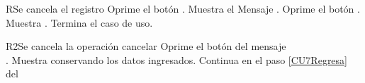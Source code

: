 \begin{UCtrayectoriaA}{R}{Se cancela el registro}
	\UCpaso[\UCactor] Oprime el botón .
	\UCpaso Muestra el Mensaje \textbf{}.
    \UCpaso[\UCactor] Oprime el botón . 
	\UCpaso Muestra .
	\UCpaso Termina el caso de uso.
\end{UCtrayectoriaA}

\begin{UCtrayectoriaA}{R2}{Se cancela la operación cancelar}
    \UCpaso[\UCactor] Oprime el botón  del mensaje
        \\\textbf{}.
    \UCpaso Muestra  conservando los datos ingresados.
    \UCpaso Continua en el paso \ref{CU7Regresa} del 
\end{UCtrayectoriaA}
